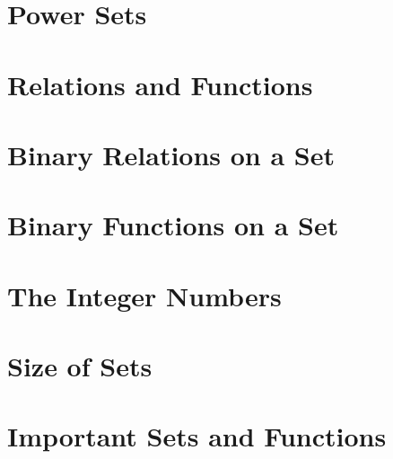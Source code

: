 
\section{Power Sets}\label{sec:math:powerset}



\section{Relations and Functions}\label{sec:math:relfun}



\section{Binary Relations on a Set}\label{sec:math:binrel}



\section{Binary Functions on a Set}\label{sec:math:binop}



\section{The Integer Numbers}\label{sec:math:int}



\section{Size of Sets}\label{sec:math:setsize}



\section{Important Sets and Functions}\label{sec:math:sets}


